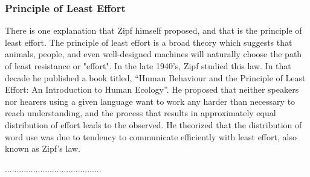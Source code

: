\documentclass[a4paper,10pt]{article}
\begin{document}
\subsubsection{Principle of Least Effort}

There is one explanation that Zipf himself proposed, and that is the principle of least effort. The principle of least effort is a broad theory which suggests that animals, people, and even well-designed machines will naturally choose the path of least resistance or "effort". In the late 1940’s, Zipf studied this law. In that decade he published a book titled, “Human Behaviour and the Principle of Least Effort: An Introduction to Human Ecology”. He proposed that neither speakers nor hearers using a given language want to work any harder than necessary to reach understanding, and the process that results in approximately equal distribution of effort leads to the observed. He theorized that the distribution of word use was due to tendency to communicate efficiently with least effort, also known as Zipf’s law. 
	
	


.........................................
\end{document}
